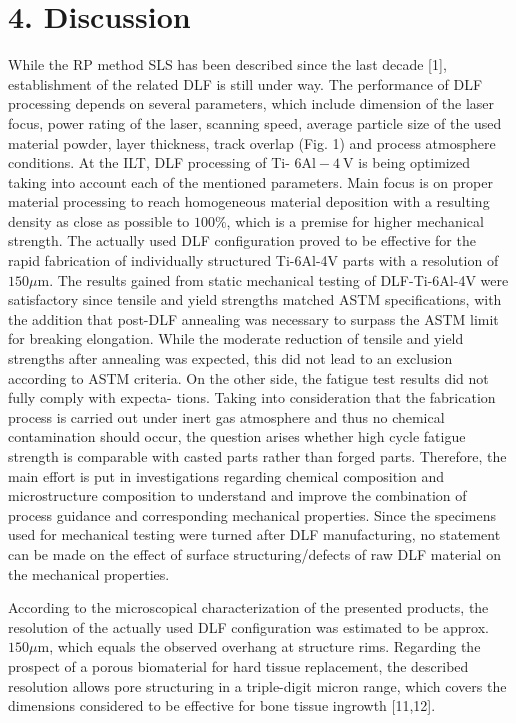 \documentclass[10pt]{article}
\begin{document}
\section*{4. Discussion}
While the RP method SLS has been described since the last decade [1], establishment of the related DLF is still under way. The performance of DLF processing depends on several parameters, which include dimension of the laser focus, power rating of the laser, scanning speed, average particle size of the used material powder, layer thickness, track overlap (Fig. 1) and process atmosphere conditions. At the ILT, DLF processing of Ti- $6 \mathrm{Al}-4 \mathrm{~V}$ is being optimized taking into account each of the mentioned parameters. Main focus is on proper material processing to reach homogeneous material deposition with a resulting density as close as possible to $100 \%$, which is a premise for higher mechanical strength. The actually used DLF configuration proved to be effective for the rapid fabrication of individually structured Ti-6Al-4V parts with a resolution of $150 \mu \mathrm{m}$. The results gained from static mechanical testing of DLF-Ti-6Al-4V were satisfactory since tensile and yield strengths matched ASTM specifications, with the addition that post-DLF annealing was necessary to surpass the ASTM limit for breaking elongation. While the moderate reduction of tensile and yield strengths after annealing was expected, this did not lead to an exclusion according to ASTM criteria. On the other side, the fatigue test results did not fully comply with expecta- tions. Taking into consideration that the fabrication process is carried out under inert gas atmosphere and thus no chemical contamination should occur, the question arises whether high cycle fatigue strength is comparable with casted parts rather than forged parts. Therefore, the main effort is put in investigations regarding chemical composition and microstructure composition to understand and improve the combination of process guidance and corresponding mechanical properties. Since the specimens used for mechanical testing were turned after DLF manufacturing, no statement can be made on the effect of surface structuring/defects of raw DLF material on the mechanical properties.

According to the microscopical characterization of the presented products, the resolution of the actually used DLF configuration was estimated to be approx. $150 \mu \mathrm{m}$, which equals the observed overhang at structure rims. Regarding the prospect of a porous biomaterial for hard tissue replacement, the described resolution allows pore structuring in a triple-digit micron range, which covers the dimensions considered to be effective for bone tissue ingrowth [11,12].
\end{document}
